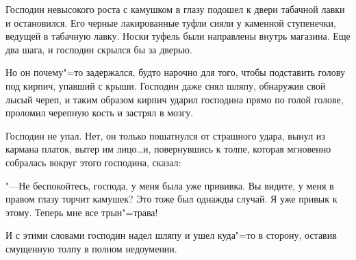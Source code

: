 
Господин  невысокого роста с камушком  в
глазу подошел к двери табачной лавки и остановился. Его черные лакированные туфли сияли
у каменной ступенечки,  ведущей  в  табачную
лавку. Носки туфель были  направлены  внутрь
магазина.  Еще два шага,  и господин скрылся
бы за дверью.
    
Но он почему"=то задержался, будто нарочно  для  того,  чтобы подставить голову  под
кирпич, упавший с крыши.  Господин даже снял
шляпу, обнаружив свой лысый череп,  и  таким
образом кирпич ударил господина прямо по голой голове,  проломил черепную кость и застрял в мозгу.
    
Господин не упал.  Нет, он только пошатнулся от страшного удара,  вынул из  кармана
платок, вытер им лицо\dots  и,  повернувшись к
толпе,  которая мгновенно  собралась  вокруг
этого господина, сказал:
    
"---Не беспокойтесь, господа,  у меня была
уже  прививка.  Вы видите,  у меня в  правом
глазу торчит камушек?  Это тоже был  однажды
случай. Я уже привык к этому. Теперь мне все
трын"=трава!
    
И с этими словами господин надел шляпу и
ушел  куда"=то  в сторону, оставив  смущенную
толпу в полном недоумении.
